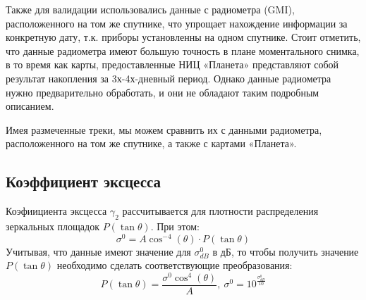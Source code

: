 Также для валидации использовались данные с радиометра (GMI), расположенного на том же спутнике, что упрощает нахождение
информации за конкретную дату, т.к. приборы установленны на одном спутнике. Стоит отметить, что данные радиометра имеют
большую точность в плане моментального снимка, в то время как карты, предоставленные НИЦ «Планета» представляют собой
результат накопления за 3х-4х-дневный период. Однако данные радиометра нужно предварительно обработать, и они не
обладают таким подробным описанием.

Имея размеченные треки, мы можем сравнить их с данными радиометра, расположенного на том же спутнике, а также с
картами «Планета».


\subsection{Коэффициент эксцесса}

Коэфиициента эксцесса $\gamma_2$ рассчитывается для плотности распределения зеркальных площадок $P(\tan \theta)$. При этом: 
\begin{equation}
  \sigma^0 = A \cos^{-4}(\theta) \cdot P(\tan \theta)
  \label{eq:8}
\end{equation}
Учитывая, что данные имеют значение для $\sigma^0_{dB}$ в дБ, то чтобы получить значение $P(\tan \theta)$ необходимо сделать
соответствующие преобразования:
\begin{equation}
  P(\tan \theta) =  \frac{\sigma^0 \cos^4(\theta)}{A},~ \sigma^0 = 10^{\frac{\sigma^0_{dB}}{10}}
  \label{eq:9}
\end{equation}

